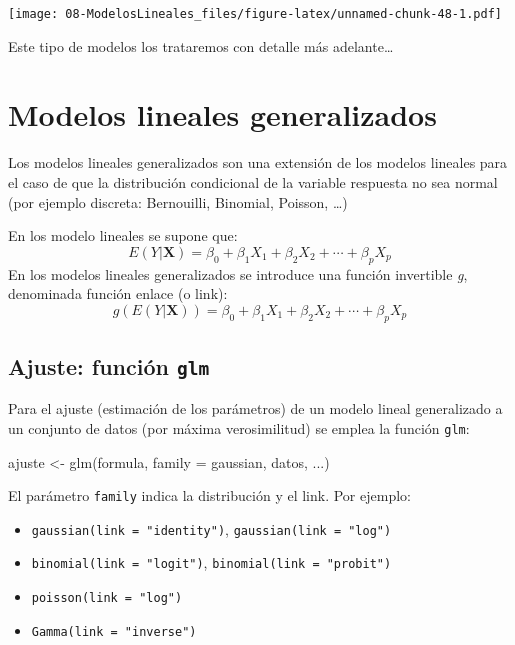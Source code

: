 \documentclass[
]{book}
\newenvironment{Shaded}{\begin{snugshade}}{\end{snugshade}}
\newcommand{\AttributeTok}[1]{\textcolor[rgb]{0.77,0.63,0.00}{#1}}
\newcommand{\FunctionTok}[1]{\textcolor[rgb]{0.00,0.00,0.00}{#1}}
\newcommand{\NormalTok}[1]{#1}
\newcommand{\OtherTok}[1]{\textcolor[rgb]{0.56,0.35,0.01}{#1}}
\theoremstyle{break}
\begin{document}
\texttt{[image: 08-ModelosLineales\_files/figure-latex/unnamed-chunk-48-1.pdf]}

Este tipo de modelos los trataremos con detalle más adelante\ldots{}

\hypertarget{modelos-lineales-generalizados}{%
\chapter{Modelos lineales generalizados}\label{modelos-lineales-generalizados}}

Los modelos lineales generalizados son una extensión de los modelos lineales para el caso de que la distribución condicional de la variable respuesta no sea normal (por ejemplo discreta: Bernouilli, Binomial, Poisson, \ldots)

En los modelo lineales se supone que:
\[E( Y | \mathbf{X} ) = \beta_{0}+\beta_{1}X_{1}+\beta_{2}X_{2}+\cdots+\beta_{p}X_{p}\]
En los modelos lineales generalizados se introduce una función invertible \emph{g}, denominada función enlace (o link):
\[g\left(E(Y | \mathbf{X} )\right) = \beta_{0}+\beta_{1}X_{1}+\beta_{2}X_{2}+\cdots+\beta_{p}X_{p}\]

\hypertarget{ajuste-funciuxf3n-glm}{%
\section{\texorpdfstring{Ajuste: función \texttt{glm}}{Ajuste: función glm}}\label{ajuste-funciuxf3n-glm}}

Para el ajuste (estimación de los parámetros) de un modelo lineal generalizado a un conjunto de datos (por máxima verosimilitud) se emplea la función \texttt{glm}:

\begin{Shaded}
\begin{Highlighting}[]
\NormalTok{ajuste }\OtherTok{\textless{}{-}} \FunctionTok{glm}\NormalTok{(formula, }\AttributeTok{family =}\NormalTok{ gaussian, datos, ...)}
\end{Highlighting}
\end{Shaded}

El parámetro \texttt{family} indica la distribución y el link. Por ejemplo:

\begin{itemize}
\item
  \texttt{gaussian(link\ =\ "identity")}, \texttt{gaussian(link\ =\ "log")}
\item
  \texttt{binomial(link\ =\ "logit")}, \texttt{binomial(link\ =\ "probit")}
\item
  \texttt{poisson(link\ =\ "log")}
\item
  \texttt{Gamma(link\ =\ "inverse")}
\end{itemize}
\end{document}
